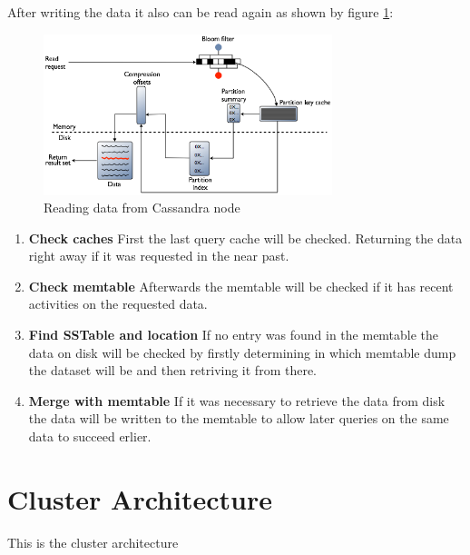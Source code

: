 After writing the data it also can be read again as shown by figure \ref{fig:cassandra:readData}:
\begin{figure}[ht]
    \centering
    \includegraphics[width=0.75\textwidth]{img/cassandra_local_read.png}
    \caption{Reading data from Cassandra node \autocite{datastaxReadData}}
    \label{fig:cassandra:readData}
\end{figure}
\begin{enumerate}
    \item \textbf{Check caches} First the last query cache will be checked. Returning the data right away if it was requested in the near past.
    \item \textbf{Check memtable} Afterwards the memtable will be checked if it has recent activities on the requested data.
    \item \textbf{Find SSTable and location} If no entry was found in the memtable the data on disk will be checked by firstly determining in which memtable dump the dataset will be and then retriving it from there.
    \item \textbf{Merge with memtable} If it was necessary to retrieve the data from disk the data will be written to the memtable to allow later queries on the same data to succeed erlier.
\end{enumerate}

\section{Cluster Architecture}\label{sec:CassandraClusterArchitecture}  %
This is the cluster architecture

